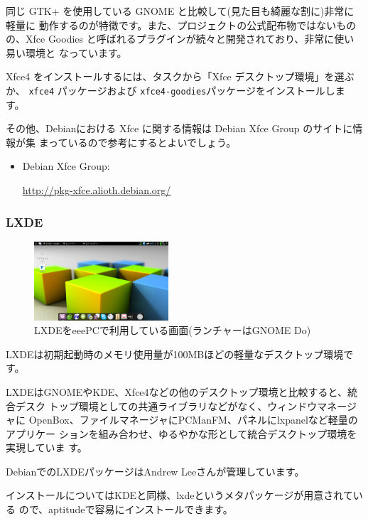 \documentclass[mingoth,a4paper]{jsarticle}
\begin{document}
同じ GTK+ を使用している GNOME と比較して(見た目も綺麗な割に)非常に軽量に
動作するのが特徴です。また、プロジェクトの公式配布物ではないものの、Xfce
Goodies と呼ばれるプラグインが続々と開発されており、非常に使い易い環境と
なっています。

Xfce4 をインストールするには、タスクから「Xfce デスクトップ環境」を選ぶか、
{\tt xfce4} パッケージおよび {\tt xfce4-goodies}パッケージをインストールします。

その他、Debianにおける Xfce に関する情報は Debian Xfce Group のサイトに情報が集
まっているので参考にするとよいでしょう。

\begin{itemize}
 \item Debian Xfce Group:

       \url{http://pkg-xfce.alioth.debian.org/}

\end{itemize}



\subsubsection{LXDE}
\begin{figure}
 \begin{center}
  \includegraphics[width=5cm]{image201004/lxde-eeepc.png}
  \caption{LXDEをeeePCで利用している画面(ランチャーはGNOME Do)}
 \end{center}
\end{figure}

LXDEは初期起動時のメモリ使用量が100MBほどの軽量なデスクトップ環境です。

LXDEはGNOMEやKDE、Xfce4などの他のデスクトップ環境と比較すると、統合デスク
トップ環境としての共通ライブラリなどがなく、ウィンドウマネージャに
OpenBox、ファイルマネージャにPCManFM、パネルにlxpanelなど軽量のアプリケー
ションを組み合わせ、ゆるやかな形として統合デスクトップ環境を実現していま
す。

DebianでのLXDEパッケージはAndrew Leeさんが管理しています。

インストールについてはKDEと同様、lxdeというメタパッケージが用意されている
ので、aptitudeで容易にインストールできます。
\\
\end{document}
